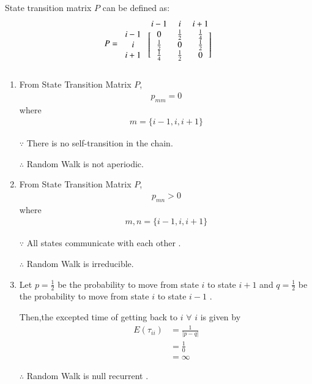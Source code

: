 \documentclass[journal,12pt,twocolumn]{IEEEtran}
\begin{document}
State transition matrix $P$ can be defined as:
\begin{align}
\label{cs2015-291}
    P=\begin{blockarray}{cccc}
& i-1 & i & i+1 \\
\begin{block}{c[ccc]}
  i-1 & 0 & \frac{1}{2}  & \frac{1}{4}  \\
  i & \frac{1}{2} & 0 & \frac{1}{2} \\
  i+1 & \frac{1}{4} & \frac{1}{2} & 0 \\
\end{block}
\end{blockarray}
\end{align}

\begin{enumerate}
    \item From State Transition Matrix $P$,
      \begin{align}
        p_{mm} = 0
    \end{align}
    where
    \begin{align}
        m=\{i-1,i,i+1\} 
    \end{align}
    
    $\because$ There is no self-transition in the chain.
    
    $\therefore$ Random Walk is not aperiodic.

    \item From State Transition Matrix $P$,
    \begin{align}
        p_{mn} > 0  
    \end{align}
    where
    \begin{align}
        m,n=\{i-1,i,i+1\} 
    \end{align}
     
    $\because$ All states communicate with each other .

    $\therefore$ Random Walk is irreducible.

    \item Let $p=\frac{1}{2}$ be the probability to move from state $i$ to state $i+1$ and $q=\frac{1}{2}$ be the probability to move from state $i$ to state $i-1$ .

    Then,the excepted time of getting back to $i$ $\forall$ $i$ is given by 
    \begin{align}
       E(\tau_{ii}) &= \frac{1}{|p-q|} \\
       &=\frac{1}{0} \\
       &= \infty
    \end{align}

    $\therefore$ Random Walk is null recurrent .

\end{enumerate}
\end{document}
